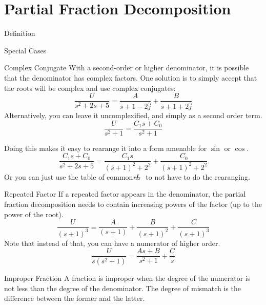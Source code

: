 \documentclass{../templates/topic}
\begin{document}
\chapter{Partial Fraction Decomposition}


\begin{section}{Definition}
\end{section}

\begin{section}{Special Cases}
	\begin{subsection}{Complex Conjugate}
		With a second-order or higher denominator, it is possible that the denominator has complex factors.
		One solution is to simply accept that the roots will be complex and use complex conjugates:
		\begin{equation*}
			\frac{U}{s^2+2s+5}=\frac{A}{s+1-2\hat{j}}+\frac{B}{s+1+2\hat{j}}
		\end{equation*}
		Alternatively, you can leave it uncomplexified, and simply as a second order term.
		\begin{equation*}
			\frac{U}{s^2+1}=\frac{C_1s+C_0}{s^2+1}
		\end{equation*}
		
		Doing this makes it easy to rearange it into a form amenable for $\sin$ or $\cos$.
		\begin{equation*}
			\frac{C_1s+C_0}{s^2+2s+5}=\frac{C_1s}{(s+1)^2+2^2}+\frac{C_0}{(s+1)^2+2^2}
		\end{equation*}
		Or you can just use the table of common $\ilaplace$ to not have to do the rearanging.
	\end{subsection}
	
	\begin{subsection}{Repeated Factor}
		If a repeated factor appears in the denominator, the partial fraction decomposition needs to contain increasing powers of the factor (up to the power of the root).
		\begin{equation*}
			\frac{U}{(s+1)^3}=\frac{A}{(s+1)}+\frac{B}{(s+1)^2}+\frac{C}{(s+1)^3}
		\end{equation*}
		Note that instead of that, you can have a numerator of higher order.
		\begin{equation*}
			\frac{U}{s(s^2+1)}=\frac{As+B}{s^2+1}+\frac{C}{s}
		\end{equation*}
		
	\end{subsection}
	\begin{subsection}{Improper Fraction}
		A fraction is improper when the degree of the numerator is not less than the degree of the denominator. The degree of mismatch is the difference between the former and the latter.
		

\end{subsection}
\end{section}
\end{document}
